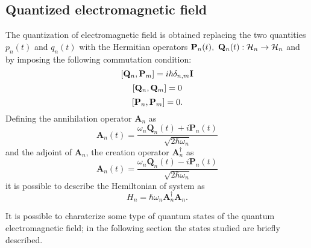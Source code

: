         \subsection{Quantized electromagnetic field}
            The quantization of electromagnetic field is obtained replacing the two quantities 
            $p_n(t)$ and $q_n(t)$ with the Hermitian operators 
            $\mathbf{P}_n(t),\ \mathbf{Q}_n(t):\Hilbert_n\to\Hilbert_n$ and by imposing the following
            commutation condition:
            \begin{equation}
                \commutator{\mathbf{Q}_n}{\mathbf{P}_m}=i\hbar\delta_{n,m}\mathbf{I}
            \end{equation}
            \begin{equation}
                \commutator{\mathbf{Q}_n}{\mathbf{Q}_m}=0
            \end{equation}
            \begin{equation}
                \commutator{\mathbf{P}_n}{\mathbf{P}_m}=0.
            \end{equation}
            Defining the annihilation operator $\mathbf{A}_n$ as
            \begin{equation}
                \mathbf{A}_n(t)=\frac{\omega_n\mathbf{Q}_n(t)+i\mathbf{P}_n(t)}{\sqrt{2\hbar\omega_n}}
                \label{eq:QEF.1}
            \end{equation}
            and the adjoint of $\mathbf{A}_n$, the creation operator $\mathbf{A}_n^\dagger$ as
            \begin{equation}
                \mathbf{A}_n(t)=\frac{\omega_n\mathbf{Q}_n(t)-i\mathbf{P}_n(t)}{\sqrt{2\hbar\omega_n}}
                \label{eq:QEF.2}
            \end{equation}
            it is possible to describe the Hemiltonian of system as
            \begin{equation}
                H_n=\hbar\omega_n\mathbf{A}_n^\dagger\mathbf{A}_n.
                \label{eq:QEF.3}
            \end{equation}

            It is possible to charaterize some type of quantum states of the quantum electromagnetic 
            field; in the following section the states studied are briefly described.